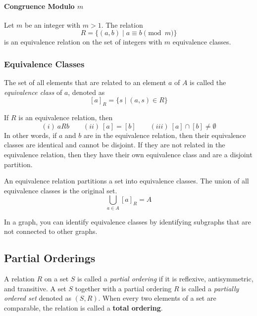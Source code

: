 \paragraph{Congruence Modulo \( m \)} Let \( m \) be an integer with \( m > 1 \). The relation \[
R = \{(a,b) \mid a \equiv b \pmod{m} \}	
\]
is an equivalence relation on the set of integers with \( m \) equivalence classes.

\subsubsection{Equivalence Classes}

The set of all elements that are related to an element \( a \) of \( A \) is called the \emph{equivalence class} of \( a \), denoted as \[
	[a]_R= \{ s \mid (a,s) \in R \}
\]

If \( R \) is an equivalence relation, then
\[
(i)\: aRb \qquad (ii)\:[a]	= [b] \qquad (iii)\:[a] \cap [b] \neq \emptyset
\]
In other words, if \( a \) and \( b \) are in the equivalence relation, then their equivalence classes are identical and cannot be disjoint. If they are not related in the equivalence relation, then they have their own equivalence class and are a disjoint partition.

An equivalence relation partitions a set into equivalence classes. The union of all equivalence classes is the original set.
\[
	\bigcup_{a \in A} [a]_R = A	
\]

In a graph, you can identify equivalence classes by identifying subgraphs that are not connected to other graphs.

\subsection{Partial Orderings}
A relation \( R \) on a set \( S \) is called a \emph{partial ordering} if it is reflexive, antisymmetric, and transitive. A set \( S \) together with a partial ordering \( R \) is called a \emph{partially ordered set} denoted as \( (S,R) \). When every two elements of a set are comparable, the relation is called a \textbf{total ordering}. 







